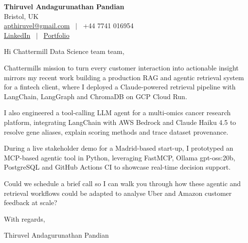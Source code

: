 \documentclass[11pt,a4paper]{article}
\begin{document}
\raggedright
\pagestyle{empty}

\begin{center}
    {\LARGE \color{linkblue} \textbf{Thiruvel Andagurunathan Pandian}}\\[0.2cm]
    Bristol, UK \\
    \href{mailto:apthiruvel@gmail.com}{apthiruvel@gmail.com} \ $|$ \ +44 7741 016954 \\
\href{https://www.linkedin.com/in/thiruvel-a-p/}{LinkedIn} \ $|$ \ \href{https://thiruvel-ap.github.io/PersonalPortfolio/}{Portfolio}
\end{center}

\vspace{0.4cm}

\noindent
Hi Chattermill Data Science team team,

Chattermill\textquotesingle{}s mission to turn every customer interaction into actionable insight mirrors my recent work building a production RAG and agentic retrieval system for a fintech client, where I deployed a Claude-powered retrieval pipeline with LangChain, LangGraph and ChromaDB on GCP Cloud Run.

I also engineered a tool-calling LLM agent for a multi-omics cancer research platform, integrating LangChain with AWS Bedrock and Claude Haiku 4.5 to resolve gene aliases, explain scoring methods and trace dataset provenance.

During a live stakeholder demo for a Madrid-based start-up, I prototyped an MCP-based agentic tool in Python, leveraging FastMCP, Ollama gpt-oss:20b, PostgreSQL and GitHub Actions CI to showcase real-time decision support.

Could we schedule a brief call so I can walk you through how these agentic and retrieval workflows could be adapted to analyse Uber and Amazon customer feedback at scale?

\vspace{0.5cm}

With regards,

Thiruvel Andagurunathan Pandian
\end{document}
